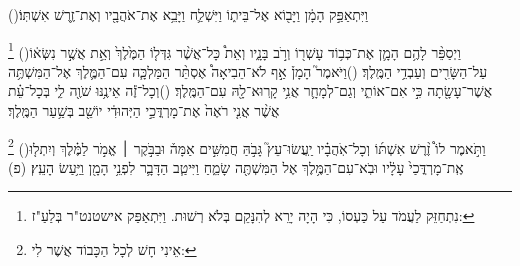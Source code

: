 \documentclass[12pt, openany]{book}
\newcommand{\footnotecomment}[1]{
	\renewcommand\thefootnote{}
	\footnote{\textsf{#1}}}
\newcommand{\commenta}[1]{\footnotecomment{#1}\hspace{0em}}
\newcommand{\vsnum}[1]{(\hebrewnumeral{#1})\space}
\begin{document}
\begin{multicols}{2}
\vsnum{10}וַיִּתְאַפַּ֣ק הָמָ֔ן וַיָּב֖וֹא אֶל־בֵּית֑וֹ וַיִּשְׁלַ֛ח וַיָּבֵ֥א אֶת־אֹהֲבָ֖יו וְאֶת־זֶ֥רֶשׁ אִשְׁתּֽוֹ׃%
\commenta{ נִתְחַזֵּק לַעֲמֹד עַל כַּעְסוֹ, כִּי הָיָה יָרֵא לְהִנָּקֵם בְּלֹא רְשׁוּת. וַיִּתְאַפַּק אישטנט"ר בְּלַעַ"ז: }%
\vsnum{11}וַיְסַפֵּ֨ר לָהֶ֥ם הָמָ֛ן אֶת־כְּב֥וֹד עָשְׁר֖וֹ וְרֹ֣ב בָּנָ֑יו וְאֵת֩ כָּל־אֲשֶׁ֨ר גִּדְּל֤וֹ הַמֶּ֙לֶךְ֙ וְאֵ֣ת אֲשֶׁ֣ר נִשְּׂא֔וֹ עַל־הַשָּׂרִ֖ים וְעַבְדֵ֥י הַמֶּֽלֶךְ׃
\vsnum{12}וַיֹּאמֶר֮ הָמָן֒ אַ֣ף לֹא־הֵבִיאָה֩ אֶסְתֵּ֨ר הַמַּלְכָּ֧ה עִם־הַמֶּ֛לֶךְ אֶל־הַמִּשְׁתֶּ֥ה אֲשֶׁר־עָשָׂ֖תָה כִּ֣י אִם־אוֹתִ֑י וְגַם־לְמָחָ֛ר אֲנִ֥י קָֽרוּא־לָ֖הּ עִם־הַמֶּֽלֶךְ׃
\vsnum{13}וְכָל־זֶ֕ה אֵינֶ֥נּוּ שֹׁוֶ֖ה לִ֑י בְּכָל־עֵ֗ת אֲשֶׁ֨ר אֲנִ֤י רֹאֶה֙ אֶת־מָרְדֳּכַ֣י הַיְּהוּדִ֔י יוֹשֵׁ֖ב בְּשַׁ֥עַר הַמֶּֽלֶךְ׃%
\commenta{ אֵינִי חָשׁ לְכָל הַכָּבוֹד אֲשֶׁר לִי:}%
\vsnum{14}וַתֹּ֣אמֶר לוֹ֩ זֶ֨רֶשׁ אִשְׁתּ֜וֹ וְכָל־אֹֽהֲבָ֗יו יַֽעֲשׂוּ־עֵץ֮ גָּבֹ֣הַּ חֲמִשִּׁ֣ים אַמָּה֒ וּבַבֹּ֣קֶר ׀ אֱמֹ֣ר לַמֶּ֗לֶךְ וְיִתְל֤וּ אֶֽת־מָרְדֳּכַי֙ עָלָ֔יו וּבֹֽא־עִם־הַמֶּ֥לֶךְ אֶל הַמִּשְׁתֶּ֖ה שָׂמֵ֑חַ וַיִּיטַ֧ב הַדָּבָ֛ר לִפְנֵ֥י הָמָ֖ן וַיַּ֥עַשׂ הָעֵֽץ׃ (פ)
\end{multicols}\clearpage
\end{document}
